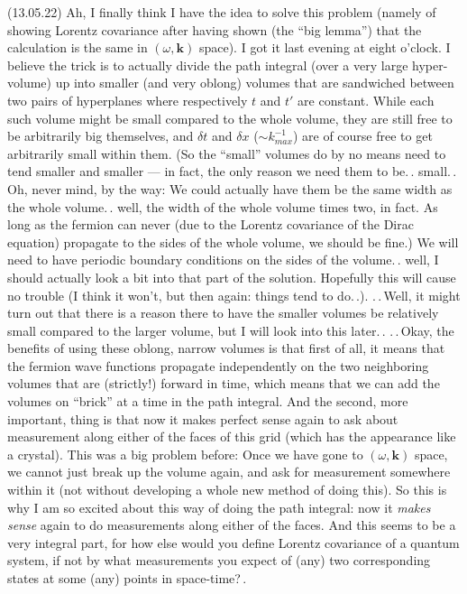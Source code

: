 \documentclass{report}
\begin{document}
(13.05.22) Ah, I finally think I have the idea to solve this problem (namely of showing Lorentz covariance after having shown (the ``big lemma'') that the calculation is the same in $(\omega, \boldsymbol{k})$ space). I got it last evening at eight o'clock. I believe the trick is to actually divide the path integral (over a very large hyper-volume) up into smaller (and very oblong) volumes that are sandwiched between two pairs of hyperplanes where respectively $t$ and $t'$ are constant. While each such volume might be small compared to the whole volume, they are still free to be arbitrarily big themselves, and $\delta t$ and $\delta x$ ($\sim k_{max}^{-1}$) are of course free to get arbitrarily small within them. (So the ``small'' volumes do by no means need to tend smaller and smaller --- in fact, the only reason we need them to be.\,. small.\,. Oh, never mind, by the way: We could actually have them be the same width as the whole volume.\,. well, the width of the whole volume times two, in fact. As long as the fermion can never (due to the Lorentz covariance of the Dirac equation) propagate to the sides of the whole volume, we should be fine.) We will need to have periodic boundary conditions on the sides of the volume.\,. well, I should actually look a bit into that part of the solution. Hopefully this will cause no trouble (I think it won't, but then again: things tend to do.\,.). .\,.\,Well, it might turn out that there is a reason there to have the smaller volumes be relatively small compared to the larger volume, but I will look into this later.\,. .\,.\,Okay, the benefits of using these oblong, narrow volumes is that first of all, it means that the fermion wave functions propagate independently on the two neighboring volumes that are (strictly!) forward in time, which means that we can add the volumes on ``brick'' at a time in the path integral. And the second, more important, thing is that now it makes perfect sense again to ask about measurement along either of the faces of this grid (which has the appearance like a crystal). This was a big problem before: Once we have gone to $(\omega, \boldsymbol{k})$ space, we cannot just break up the volume again, and ask for measurement somewhere within it (not without developing a whole new method of doing this). So this is why I am so excited about this way of doing the path integral: now it \emph{makes sense} again to do measurements along either of the faces. And this seems to be a very integral part, for how else would you define Lorentz covariance of a quantum system, if not by what measurements you expect of (any) two corresponding states at some (any) points in space-time?\,. 
\end{document}
